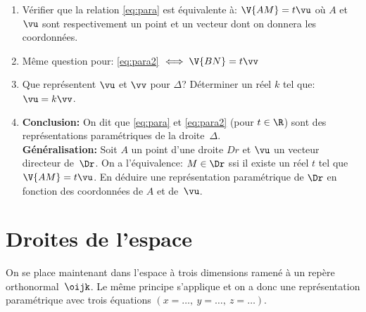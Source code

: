 \begin{exercice}
\begin{enumerate}
\item V\'erifier que la relation \eqref{eq:para} est \'equivalente
  \`a: $\V{AM}=t\vu$ o\`u $A$ et $\vu$ sont respectivement un point et
  un vecteur dont on donnera les  coordonn\'ees.

\item M\^eme question pour: \eqref{eq:para2} $\iff \V{BN}=t\vv$

\item Que repr\'esentent $\vu$ et $\vv$ pour $\Delta$? D\'eterminer un
  r\'eel $k$ tel que: $\vu=k\vv$.

\item \textbf{Conclusion:} On dit que \eqref{eq:para} et
  \eqref{eq:para2} (pour $t\in\R$) sont des repr\'esentations
  param\'etriques de la droite~$\Delta$. \\
\textbf{G\'en\'eralisation:} Soit $A$
  un point d'une droite $Dr$ et $\vu$ un vecteur directeur
  de~$\Dr$. On a l'\'equivalence: $M\in\Dr$ ssi il existe un
  r\'eel $t$ tel que $\V{AM}=t\vu$. En d\'eduire une repr\'esentation
  param\'etrique de $\Dr$ en fonction des coordonn\'ees de $A$ et de~$\vu$.
\end{enumerate}
\section{Droites de l'espace}
On se place maintenant dans l'espace \`a trois dimensions ramen\'e \`a
un rep\`ere orthonormal~$\oijk$. Le m\^eme principe s'applique et on a
donc une repr\'esentation param\'etrique avec trois \'equations
$(x=\ldots,\ y=\ldots,\ z=\ldots)$.


 
\end{exercice}
